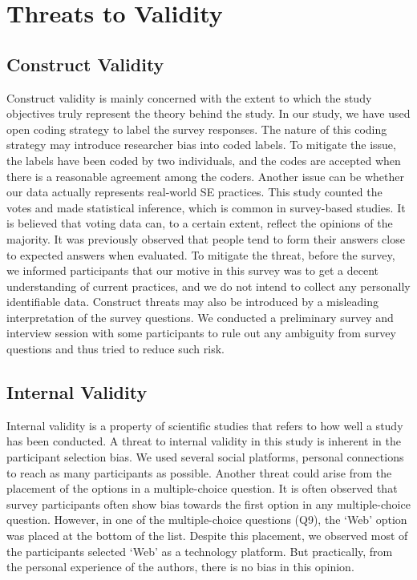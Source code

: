 \section{Threats to Validity}
\label{validity}

\subsection{Construct Validity}
Construct validity is mainly concerned with the extent to which the
study objectives truly represent the theory behind the study\cite{Wohlin2012}. In our study, we have used open coding strategy to label the survey responses. The nature of this coding strategy may introduce researcher bias into coded labels. To mitigate the issue, the labels have been coded by two individuals, and the codes are accepted when there is a reasonable agreement among the coders. Another issue can be whether our data actually represents real-world SE practices. This study counted the votes and made statistical inference, which is common in survey-based studies. It is believed that voting data can, to a certain extent, reflect the opinions of the majority. It was previously observed\cite{Garousi2015} that people tend to form their answers close to expected answers when evaluated. To mitigate the threat, before the survey, we informed participants that our motive in this survey was to get a decent understanding of current practices, and we do not intend to collect any personally identifiable data. Construct threats may also be introduced by a misleading interpretation of the survey questions. We conducted a preliminary survey and interview session with some participants to rule out any ambiguity from survey questions and thus tried to reduce such risk.

\subsection{Internal Validity}
Internal validity is a property of scientific studies that refers to how well a study has been conducted. A threat to internal validity in this study is inherent in the participant selection bias. We used several social platforms, personal connections to reach as many participants as possible. Another threat could arise from the placement of the options in a multiple-choice question. It is often observed that survey participants often show bias towards the first option in any multiple-choice question\cite{Uddin2019}. However, in one of the multiple-choice questions (Q9), the `Web' option was placed at the bottom of the list. Despite this placement, we observed most of the participants selected `Web' as a technology platform. But practically, from the personal experience of the authors, there is no bias in this opinion.


